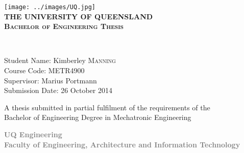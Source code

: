 \begin{titlepage}

\begin{center}

\texttt{[image: ../images/UQ.jpg]}\\[1.5cm]    

\textsc{\Large \bfseries {\Huge T}HE {\Huge U}NIVERSITY OF {\Huge Q}UEENSLAND}\\[2cm]

\textsc{\large \bfseries Bachelor of Engineering Thesis}\\[1.5cm]


\newlength{\mylength}

\setlength{\fboxsep}{1pt}
\setlength{\mylength}{\linewidth}

\addtolength{\mylength}{-1.5\fboxsep}
\addtolength{\mylength}{-1.5\fboxrule}


		
\textsc{}\\[1.5cm]

\begin{minipage}{0.8\textwidth}
\begin{flushleft} \large
Student Name: Kimberley \textsc{Manning}\\[0.1cm]
Course Code: METR4900\\[0.1cm]
Supervisor: Marius Portmann\\[0.1cm]
Submission Date: 26 October 2014\\[0.1cm]
\end{flushleft}
\end{minipage}




\vfill


{\small A thesis submitted in partial fulfilment of the requirements of the\\
Bachelor of Engineering Degree in Mechatronic Engineering\\[1.5cm]}

\textcolor{Gray}
{
{\small  \bfseries UQ Engineering\\[0.5cm]
Faculty of Engineering, Architecture and Information Technology}
}


\end{center}

\end{titlepage}
